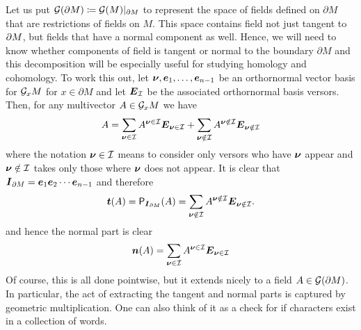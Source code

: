 \documentclass{article}
\begin{document}
Let us put $\mathcal{G}(\partial M)\coloneqq \mathcal{G}(M)\vert_{\partial M}$ to represent the space of fields defined on $\partial M$ that are restrictions of fields on $M$. This space contains field not just tangent to ${\partial M}$, but fields that have a normal component as well. Hence, we will need to know whether components of field is tangent or normal to the boundary $\partial M$ and this decomposition will be especially useful for studying homology and cohomology. To work this out, let $\boldsymbol{\nu},\boldsymbol{e}_1,\dots,\boldsymbol{e}_{n-1}$ be an orthornormal vector basis for $\mathcal{G}_xM$ for $x\in \partial M$ and let $\boldsymbol{E}_\mathcal{I}$ be the associated orthornormal basis versors. Then, for any multivector $A\in \mathcal{G}_xM$ we have
\begin{equation}
\label{eq:tangent_normal_decomposition}
A = \sum_{\boldsymbol{\nu} \in \mathcal{I}} A^{\boldsymbol{\nu} \in \mathcal{I}} \boldsymbol{E}_{\boldsymbol{\nu} \in \mathcal{I}} + \sum_{{\boldsymbol{\nu} \notin \mathcal{I}} } A^{{\boldsymbol{\nu} \notin \mathcal{I}}} \boldsymbol{E}_{\boldsymbol{\nu} \notin \mathcal{I}} 
\end{equation}
where the notation $\boldsymbol{\nu} \in \mathcal{I}$ means to consider only versors who have $\boldsymbol{\nu}$ appear and $\boldsymbol{\nu} \notin \mathcal{I}$ takes only those where $\boldsymbol{\nu}$ does not appear. It is clear that $\boldsymbol{I}_{\partial M} = \boldsymbol{e}_{1}\boldsymbol{e}_{2}\cdots \boldsymbol{e}_{n-1}$ and therefore
\begin{equation}
\label{eq:tangentpart}
\boldsymbol{t}(A) = \mathsf{P}_{\boldsymbol{I}_{\partial M}}(A) = \sum_{{\boldsymbol{\nu} \notin \mathcal{I}} } A^{{\boldsymbol{\nu} \notin \mathcal{I}}} \boldsymbol{E}_{\boldsymbol{\nu} \notin \mathcal{I}}.
\end{equation}
and hence the normal part is clear
\begin{equation}
\label{eq:normalpart}
\boldsymbol{n}(A) = \sum_{\boldsymbol{\nu} \in \mathcal{I}} A^{\boldsymbol{\nu} \in \mathcal{I}} \boldsymbol{E}_{\boldsymbol{\nu} \in \mathcal{I}}
\end{equation}
Of course, this is all done pointwise, but it extends nicely to a field $A\in \mathcal{G}(\partial M)$. In particular, the act of extracting the tangent and normal parts is captured by geometric multiplication. One can also think of it as a check for if characters exist in a collection of words.
\end{document}
